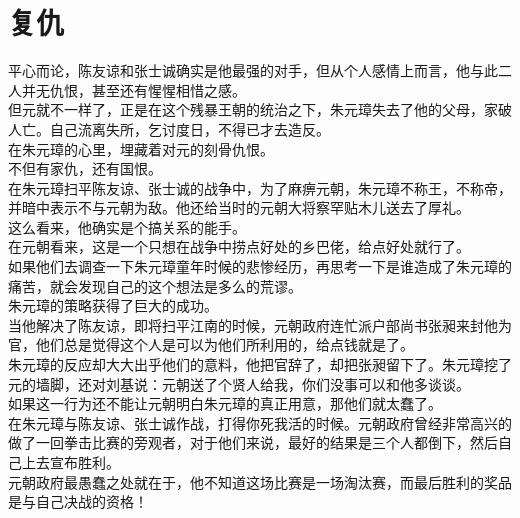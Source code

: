 \section{复仇}
\ifnum{}
	\begin{multicols}{\theparacolNo}
\fi
平心而论，陈友谅和张士诚确实是他最强的对手，但从个人感情上而言，他与此二人并无仇恨，甚至还有惺惺相惜之感。\\

但元就不一样了，正是在这个残暴王朝的统治之下，朱元璋失去了他的父母，家破人亡。自己流离失所，乞讨度日，不得已才去造反。\\

在朱元璋的心里，埋藏着对元的刻骨仇恨。\\

不但有家仇，还有国恨。\\

在朱元璋扫平陈友谅、张士诚的战争中，为了麻痹元朝，朱元璋不称王，不称帝，并暗中表示不与元朝为敌。他还给当时的元朝大将察罕贴木儿送去了厚礼。\\

这么看来，他确实是个搞关系的能手。\\

在元朝看来，这是一个只想在战争中捞点好处的乡巴佬，给点好处就行了。\\

如果他们去调查一下朱元璋童年时候的悲惨经历，再思考一下是谁造成了朱元璋的痛苦，就会发现自己的这个想法是多么的荒谬。\\

朱元璋的策略获得了巨大的成功。\\

当他解决了陈友谅，即将扫平江南的时候，元朝政府连忙派户部尚书张昶来封他为官，他们总是觉得这个人是可以为他们所利用的，给点钱就是了。\\

朱元璋的反应却大大出乎他们的意料，他把官辞了，却把张昶留下了。朱元璋挖了元的墙脚，还对刘基说：元朝送了个贤人给我，你们没事可以和他多谈谈。\\

如果这一行为还不能让元朝明白朱元璋的真正用意，那他们就太蠢了。\\

在朱元璋与陈友谅、张士诚作战，打得你死我活的时候。元朝政府曾经非常高兴的做了一回拳击比赛的旁观者，对于他们来说，最好的结果是三个人都倒下，然后自己上去宣布胜利。\\

元朝政府最愚蠢之处就在于，他不知道这场比赛是一场淘汰赛，而最后胜利的奖品是与自己决战的资格！\\


\end{multicols}

